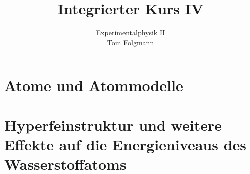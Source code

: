 \documentclass{article}
\title{Integrierter Kurs IV}
\author{Experimentalphysik II\\Tom Folgmann}
\begin{document}
    \maketitle
    \tableofcontents

    \section{Atome und Atommodelle}
        
        
        
        
        
        
        
        
        

        
        

        
        

        
        
        
        
        
        

    \section{Hyperfeinstruktur und weitere Effekte auf die Energieniveaus des Wasserstoffatoms}
        


    \newpage
    
\end{document}
